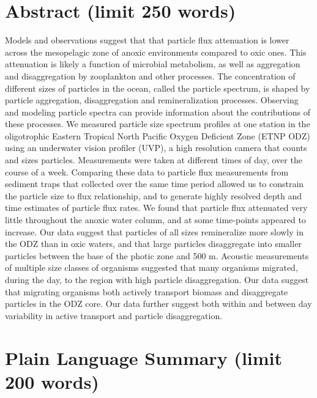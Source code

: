 \documentclass[]{article}
\begin{document}
\hypertarget{abstract-limit-250-words}{%
\section{Abstract (limit 250 words)}\label{abstract-limit-250-words}}

Models and observations suggest that that particle flux attenuation is
lower across the mesopelagic zone of anoxic environments compared to
oxic ones. This attenuation is likely a function of microbial
metabolism, as well as aggregation and disaggregation by zooplankton and
other processes. The concentration of different sizes of particles in
the ocean, called the particle spectrum, is shaped by particle
aggregation, disaggregation and remineralization processes. Observing
and modeling particle spectra can provide information about the
contributions of these processes. We measured particle size spectrum
profiles at one station in the oligotrophic Eastern Tropical North
Pacific Oxygen Deficient Zone (ETNP ODZ) using an underwater vision
profiler (UVP), a high resolution camera that counts and sizes
particles. Measurements were taken at different times of day, over the
course of a week. Comparing these data to particle flux measurements
from sediment traps that collected over the same time period allowed us
to constrain the particle size to flux relationship, and to generate
highly resolved depth and time estimates of particle flux rates. We
found that particle flux attenuated very little throughout the anoxic
water column, and at some time-points appeared to increase. Our data
suggest that particles of all sizes remineralize more slowly in the ODZ
than in oxic waters, and that large particles disaggregate into smaller
particles between the base of the photic zone and 500 m. Acoustic
measurements of multiple size classes of organisms suggested that many
organisms migrated, during the day, to the region with high particle
disaggregation. Our data suggest that migrating organisms both actively
transport biomass and disaggregate particles in the ODZ core. Our data
further suggest both within and between day variability in active
transport and particle disaggregation.

\hypertarget{plain-language-summary-limit-200-words}{%
\section{Plain Language Summary (limit 200
words)}\label{plain-language-summary-limit-200-words}}
\end{document}
